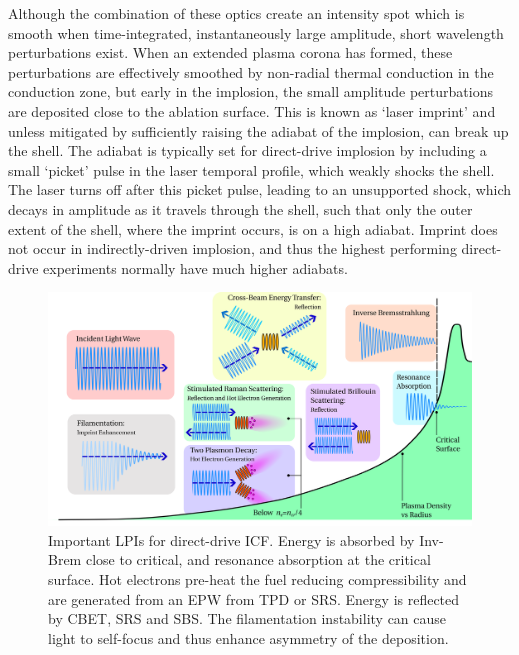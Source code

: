 Although the combination of these optics create an intensity spot which is smooth when time-integrated, instantaneously large amplitude, short wavelength perturbations exist.
When an extended plasma corona has formed, these perturbations are effectively smoothed by non-radial thermal conduction in the conduction zone, but early in the implosion, the small amplitude perturbations are deposited close to the ablation surface.
This is known as `laser imprint' and unless mitigated by sufficiently raising the adiabat of the implosion, can break up the shell.
The adiabat is typically set for direct-drive implosion by including a small `picket' pulse in the laser temporal profile, which weakly shocks the shell.
The laser turns off after this picket pulse, leading to an unsupported shock, which decays in amplitude as it travels through the shell, such that only the outer extent of the shell, where the imprint occurs, is on a high adiabat.
Imprint does not occur in indirectly-driven implosion, and thus the highest performing direct-drive experiments normally have much higher adiabats.

\begin{figure}[t!]
    \includegraphics[width=\linewidth]{Introduction/Images/LPI diagram.png}
    \centering
    \caption{Important \ac{LPIs} for direct-drive \ac{ICF}.
    Energy is absorbed by \ac{Inv-Brem} close to critical, and resonance absorption at the critical surface.
    Hot electrons pre-heat the fuel reducing compressibility and are generated from an \ac{EPW} from \ac{TPD} or \ac{SRS}.
    Energy is reflected by \ac{CBET}, \ac{SRS} and \ac{SBS}.
    The filamentation instability can cause light to self-focus and thus enhance asymmetry of the deposition.
    }%
    \label{fig:intro_dd_lpis}
\end{figure}

